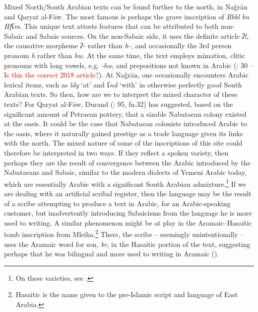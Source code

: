 \documentclass[output=paper]{langsci/langscibook}
\begin{document}
Mixed North/South Arabian texts can be found further to the north, in Naǧrān and Qaryat al-Fāw. The most famous is perhaps the grave inscription of \textit{Rbbl bn Hfʕm}. This unique text attests features that can be attributed to both non-Sabaic and Sabaic sources. On the non-Sabaic side, it uses the definite article \textit{ʔl}, the causative morpheme \textit{ʔ-} rather than \textit{h-}, and occasionally the 3rd person pronoun \textit{h} rather than \textit{hw}. At the same time, the text employs mimation, clitic pronouns with long vowels, e.g. \textit{-hw}, and prepositions not known in Arabic (\citealt{Al-Jallad2018ANA}: 30 \textcolor{red}{-- Is this the correct 2018 article?}). At Naǧrān, one occasionally encounters Arabic lexical items, such as \textit{ldy} ‘at’ and \textit{ʕnd} ‘with’ in otherwise perfectly good South Arabian texts. So then, how are we to interpret the mixed character of these texts? For Qaryat al-Fāw, Durand (\citeyear{Durand2017}: 95, fn.32) has suggested, based on the significant amount of Petraean pottery, that a sizable Nabataean colony existed at the oasis. It could be the case that Nabataean colonists introduced Arabic to the oasis, where it naturally gained prestige as a trade language given its links with the north. The mixed nature of some of the inscriptions of this site could therefore be interpreted in two ways. If they reflect a spoken variety, then perhaps they are the result of convergence between the Arabic introduced by the Nabataeans and Sabaic, similar to the modern dialects of Yemeni Arabic today, which are essentially Arabic with a significant South Arabian admixture.\footnote{On these varieties, see \citet{Watson2018}.} If we are dealing with an artificial scribal register, then the language may be the result of a scribe attempting to produce a text in Arabic, for an Arabic-speaking customer, but inadvertently introducing Sabaicisms from the language he is more used to writing. A similar phenomenon might be at play in the Aramaic–Hasaitic tomb inscription from Mleiha.\footnote{Hasaitic is the name given to the pre-Islamic script and language of East Arabia.} There, the scribe – seemingly unintentionally – uses the Aramaic word for son, \textit{br}, in the Hasaitic portion of the text, suggesting perhaps that he was bilingual and more used to writing in Aramaic (\citealt{Overlaetetal2016}).
\end{document}

